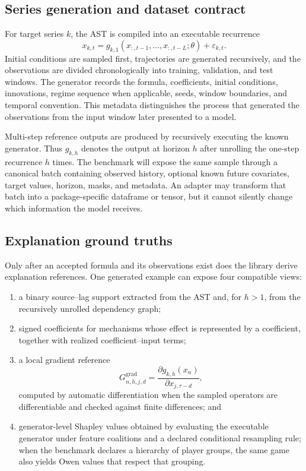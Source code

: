\subsection{Series generation and dataset contract}

For target series $k$, the AST is compiled into an executable recurrence
\[
x_{k,t}=g_{k,1}\!\left(x_{:,t-1},\ldots,x_{:,t-L};\theta\right)
       +\varepsilon_{k,t}.
\]
Initial conditions are sampled first, trajectories are generated recursively,
and the observations are divided chronologically into training, validation,
and test windows. The generator records the formula, coefficients, initial
conditions, innovations, regime sequence when applicable, seeds, window
boundaries, and temporal convention. This metadata distinguishes the process
that generated the observations from the input window later presented to a
model.

Multi-step reference outputs are produced by recursively executing the known
generator. Thus $g_{k,h}$ denotes the output at horizon $h$ after unrolling the
one-step recurrence $h$ times. The benchmark will expose the same sample through
a canonical batch containing observed history, optional known future
covariates, target values, horizon, masks, and metadata. An adapter may transform
that batch into a package-specific dataframe or tensor, but it cannot silently
change which information the model receives.

\subsection{Explanation ground truths}

Only after an accepted formula and its observations exist does the library
derive explanation references. One generated example can expose four
compatible views:

\begin{enumerate}
    \item a binary source--lag support extracted from the AST and, for
    $h>1$, from the recursively unrolled dependency graph;
    \item signed coefficients for mechanisms whose effect is represented by a
    coefficient, together with realized coefficient--input terms;
    \item a local gradient reference
    \[
    G^{\mathrm{grad}}_{n,h,j,d}
      =\frac{\partial g_{k,h}(x_n)}
             {\partial x_{j,\tau-d}},
    \]
    computed by automatic differentiation when the sampled operators are
    differentiable and checked against finite differences; and
    \item generator-level Shapley values obtained by evaluating the executable
    generator under feature coalitions and a declared conditional resampling
    rule; when the benchmark declares a hierarchy of player groups, the same
    game also yields Owen values that respect that grouping.
\end{enumerate}

